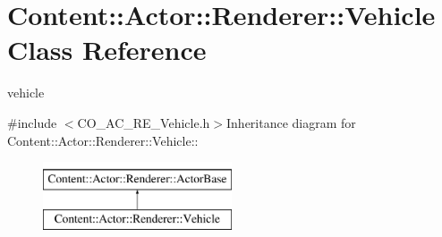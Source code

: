 \hypertarget{classContent_1_1Actor_1_1Renderer_1_1Vehicle}{
\section{Content::Actor::Renderer::Vehicle Class Reference}
\label{classContent_1_1Actor_1_1Renderer_1_1Vehicle}
}


vehicle  


{\ttfamily \#include $<$CO\_\-AC\_\-RE\_\-Vehicle.h$>$}Inheritance diagram for Content::Actor::Renderer::Vehicle::\begin{figure}[H]
\begin{center}
\leavevmode
\includegraphics[height=2cm]{classContent_1_1Actor_1_1Renderer_1_1Vehicle}
\end{center}
\end{figure}
